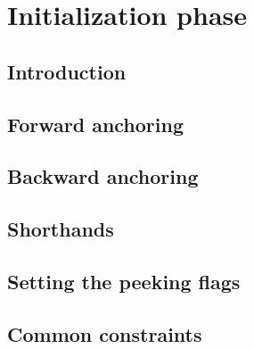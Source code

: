 

\section{Initialization phase         \lispTodo{}}
\subsection{Introduction              \lispNone{}}   \label{hub: initialization phase: introduction}             
\subsection{Forward  anchoring        \lispTodo{}}   \label{hub: initialization phase: anchoring forward}        
\subsection{Backward anchoring        \lispTodo{}}   \label{hub: initialization phase: anchoring backward}       
\subsection{Shorthands                \lispTodo{}}   \label{hub: initialization phase: shorthands}               
\subsection{Setting the peeking flags \lispTodo{}}   \label{hub: initialization phase: setting peeking flags}    
\subsection{Common constraints        \lispTodo{}}   \label{hub: initialization phase: common constraints}       

